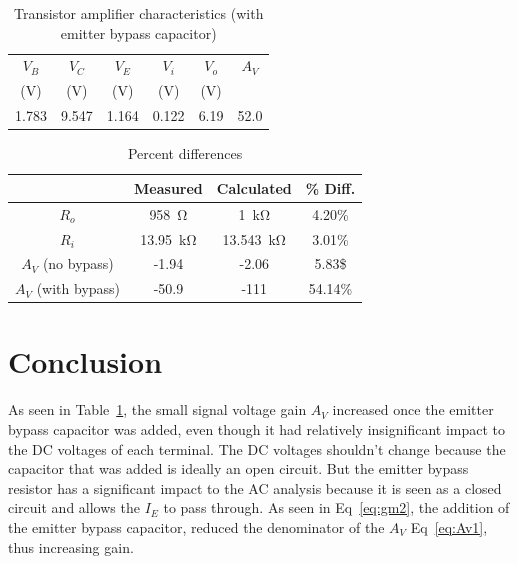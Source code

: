 \begin{table}[hbtp]
  \centering
  \begin{tabular}{ccc|cc|c}
    $V_B$    & $V_C$    & $V_E$    & $V_i$    & $V_o$    & $A_V$ \\
    (\si{V}) & (\si{V}) & (\si{V}) & (\si{V}) & (\si{V}) &       \\
    \hline
    1.783    & 9.547    & 1.164    & 0.122    & 6.19     & 52.0
  \end{tabular}
  \caption{\label{tab:amp_bypass} Transistor amplifier characteristics (with emitter bypass capacitor)}
\end{table}

\begin{table}[hbtp]
  \centering
  \begin{tabular}{c|ccc}
    & Measured & Calculated & \% Diff. \\
    \hline
    $R_o$ & \SI{958}{\ohm} & \SI{1}{\kilo\ohm} & 4.20\% \\
    $R_i$ & \SI{13.95}{\kilo\ohm} & \SI{13.543}{\kilo\ohm} & 3.01\% \\
    $A_V$ (no bypass) & -1.94 & -2.06 & 5.83\$ \\
    $A_V$ (with bypass) & -50.9 & -111 & 54.14\% \\
  \end{tabular}
  \caption{\label{tab:gains} Percent differences}
\end{table}

\newpage

\section{Conclusion}
\label{sec:conclusion}

As seen in Table~\ref{tab:amp_bypass}, the small signal voltage gain $A_V$ increased once the emitter bypass capacitor was added, even though it had relatively insignificant impact to the DC voltages of each terminal. The DC voltages shouldn’t change because the capacitor that was added is ideally an open circuit. But the emitter bypass resistor has a significant impact to the AC analysis because it is seen as a closed circuit and allows the $I_E$ to pass through. As seen in Eq~\ref{eq:gm2}, the addition of the emitter bypass capacitor, reduced the denominator of the $A_V$ Eq~\ref{eq:Av1}, thus increasing gain.

